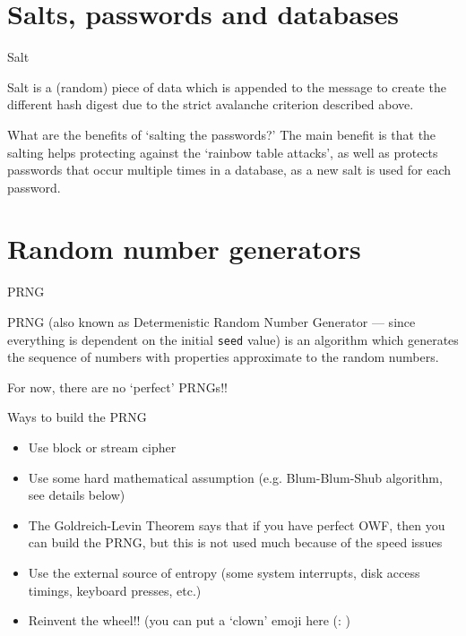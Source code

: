 \documentclass{beamer}
\begin{document}
\section{Salts, passwords and databases}

\begin{frame}{Salt}
    \begin{definition}
        Salt is a (random) piece of data which is appended to the message to
        create the different hash digest due to the strict avalanche criterion
        described above.
    \end{definition}
    \pause
    What are the benefits of `salting the passwords?'
    \pause
    The main benefit is that the salting helps protecting against the `rainbow
    table attacks', as well as protects passwords that occur multiple times in
    a database, as a new salt is used for each password.
\end{frame}

\section{Random number generators}

\begin{frame}{PRNG}
    \begin{definition}
        PRNG (also known as Determenistic Random Number Generator --- since 
        everything is dependent on the initial \texttt{seed} value) is an 
        algorithm which generates the sequence of numbers with properties 
        approximate to the random numbers.
    \end{definition}
    \pause
    For now, there are no `perfect' PRNGs!!
\end{frame}

\begin{frame}{Ways to build the PRNG}
    \begin{itemize}
        \item Use block or stream cipher
        \item Use some hard mathematical assumption (e.g. Blum-Blum-Shub 
        algorithm, see details below)
        \item The Goldreich-Levin Theorem says that if you have perfect OWF, 
        then you can build the PRNG, but this is not used much because of the 
        speed issues
        \item Use the external source of entropy (some system interrupts, disk
        access timings, keyboard presses, etc.)
        \item Reinvent the wheel!! (you can put a `clown' emoji here (: )
    \end{itemize}
\end{frame}
\end{document}
